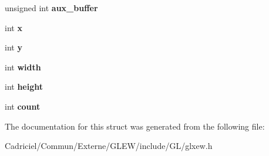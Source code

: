 \begin{DoxyCompactItemize}
\item 
unsigned int {\bfseries aux\+\_\+buffer}\hypertarget{struct_g_l_x_pbuffer_clobber_event_a13193b6e7e3e52b15f754fe91403b7ec}{}\label{struct_g_l_x_pbuffer_clobber_event_a13193b6e7e3e52b15f754fe91403b7ec}

\item 
int {\bfseries x}\hypertarget{struct_g_l_x_pbuffer_clobber_event_a8f0a7162a033c89ee94ce535580dbc32}{}\label{struct_g_l_x_pbuffer_clobber_event_a8f0a7162a033c89ee94ce535580dbc32}

\item 
int {\bfseries y}\hypertarget{struct_g_l_x_pbuffer_clobber_event_a69eb7ac60d36ac3ec4550ac206cfc61f}{}\label{struct_g_l_x_pbuffer_clobber_event_a69eb7ac60d36ac3ec4550ac206cfc61f}

\item 
int {\bfseries width}\hypertarget{struct_g_l_x_pbuffer_clobber_event_aaca375fecb872c73c60cd5d0bfc7c7a5}{}\label{struct_g_l_x_pbuffer_clobber_event_aaca375fecb872c73c60cd5d0bfc7c7a5}

\item 
int {\bfseries height}\hypertarget{struct_g_l_x_pbuffer_clobber_event_aed4e539c896bdad15217bf92c28f8520}{}\label{struct_g_l_x_pbuffer_clobber_event_aed4e539c896bdad15217bf92c28f8520}

\item 
int {\bfseries count}\hypertarget{struct_g_l_x_pbuffer_clobber_event_a61e9f6b31738464dca67f909fcacd298}{}\label{struct_g_l_x_pbuffer_clobber_event_a61e9f6b31738464dca67f909fcacd298}

\end{DoxyCompactItemize}


The documentation for this struct was generated from the following file\+:\begin{DoxyCompactItemize}
\item 
Cadriciel/\+Commun/\+Externe/\+G\+L\+E\+W/include/\+G\+L/glxew.\+h\end{DoxyCompactItemize}
